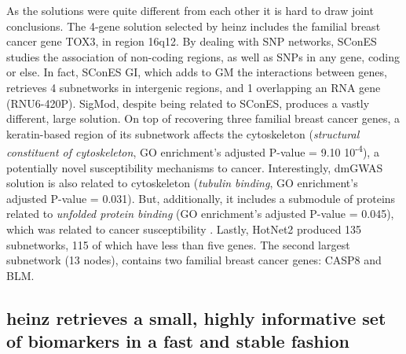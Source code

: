 \documentclass[twocolumn, 10pt]{article}
\begin{document}
As the solutions were quite different from each other it is hard to draw joint conclusions. The 4-gene solution selected by heinz includes the familial breast cancer gene TOX3, in region 16q12. By dealing with SNP networks, SConES studies the association of non-coding regions, as well as SNPs in any gene, coding or else. In fact, SConES GI, which adds to GM the interactions between genes, retrieves 4 subnetworks in intergenic regions, and 1 overlapping an RNA gene (RNU6-420P). SigMod, despite being related to SConES, produces a vastly different, large solution. On top of recovering three familial breast cancer genes, a keratin-based region of its subnetwork affects the cytoskeleton (\emph{structural constituent of cytoskeleton}, GO enrichment's adjusted P-value = 9.10 \texttimes{} 10\textsuperscript{-4}), a potentially novel susceptibility mechanisms to cancer. Interestingly, dmGWAS solution is also related to cytoskeleton (\emph{tubulin binding}, GO enrichment's adjusted P-value = 0.031). But, additionally, it includes a submodule of proteins related to \emph{unfolded protein binding} (GO enrichment's adjusted P-value = 0.045), which was related to cancer susceptibility \cite{calderwood_heat_2016}. Lastly, HotNet2 produced 135 subnetworks, 115 of which have less than five genes. The second largest subnetwork (13 nodes), contains two familial breast cancer genes: CASP8 and BLM.

\subsection{heinz retrieves a small, highly informative set of biomarkers in a fast and stable fashion}
\label{sec:orgb834a56}
\end{document}
